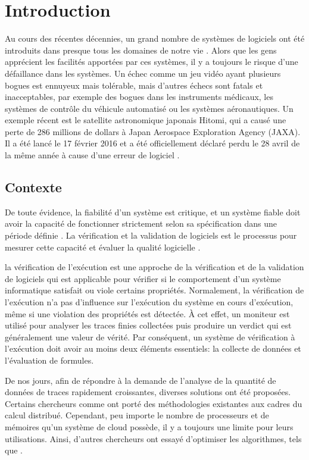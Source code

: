 
\chapter{Introduction}

Au cours des récentes décennies, un grand nombre de systèmes de logiciels ont été introduits dans presque tous les domaines de notre vie \citep{clarke1999model}. Alors que les gens apprécient les facilités apportées par ces systèmes, il y a toujours le risque d'une défaillance dans les systèmes. Un échec comme un jeu vidéo ayant plusieurs bogues est ennuyeux mais tolérable, mais d'autres échecs sont fatals et inacceptables, par exemple des bogues dans les instruments médicaux, les systèmes de contrôle du véhicule automatisé ou les systèmes aéronautiques. Un exemple récent est le satellite astronomique japonais Hitomi, qui a causé une perte de 286 millions de dollars à Japan Aerospace Exploration Agency (JAXA). Il a été lancé le 17 février 2016 et a été officiellement déclaré perdu le 28 avril de la même année à cause d'une erreur de logiciel \citep{nature2016}.

\section{Contexte}

De toute évidence, la fiabilité d'un système est critique, et un système fiable doit avoir la capacité de fonctionner strictement selon sa spécification dans une période définie \citep{avivzienis2004basic}. La vérification et la validation de logiciels est le processus pour mesurer cette capacité et évaluer la qualité logicielle \citep{ieeestd2012}.

la vérification de l'exécution \citep{leucker2009brief} est une approche de la vérification et de la validation de logiciels qui est applicable pour vérifier si le comportement d'un système informatique satisfait ou viole certains propriétés. Normalement, la vérification de l'exécution n'a pas d'influence sur l'exécution du système en cours d'exécution, même si une violation des propriétés est détectée. À cet effet, un moniteur est utilisé pour analyser les traces finies collectées puis produire un verdict qui est généralement une valeur de vérité. Par conséquent, un système de vérification à l'exécution doit avoir au moins deux éléments essentiels: la collecte de données et l'évaluation de formules.

De nos jours, afin de répondre à la demande de l'analyse de la quantité de données de traces rapidement croissantes, diverses solutions ont été proposées. Certains chercheurs comme \cite{barre2012mapreduce} ont porté des méthodologies existantes aux cadres du calcul distribué. Cependant, peu importe le nombre de processeurs et de mémoires qu'un système de cloud possède, il y a toujours une limite pour leurs utilisations. Ainsi, d'autres chercheurs ont essayé d'optimiser les algorithmes, tels que \cite{havelund2001monitoring}.

